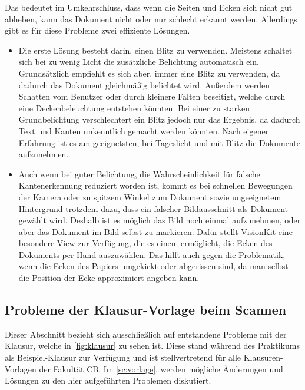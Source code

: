 \documentclass[notables, nomenclature, oneside, 150]{HSMW-Thesis}
\begin{document}
			Das bedeutet im Umkehrschluss, dass wenn die Seiten und Ecken sich nicht gut abheben, kann das Dokument nicht oder nur schlecht erkannt werden. Allerdings gibt es für diese Probleme zwei effiziente Lösungen. 
			\begin{itemize}
				\item Die erste Lösung besteht darin, einen Blitz zu verwenden. Meistens schaltet sich bei zu wenig Licht die zusätzliche Belichtung automatisch ein. Grundsätzlich empfiehlt es sich aber, immer eine Blitz zu verwenden, da dadurch das Dokument gleichmäßig belichtet wird. Außerdem werden Schatten vom Benutzer oder durch kleinere Falten beseitigt, welche durch eine Deckenbeleuchtung entstehen könnten. Bei einer zu starken Grundbelichtung verschlechtert ein Blitz jedoch nur das Ergebnis, da dadurch Text und Kanten unkenntlich gemacht werden könnten. Nach eigener Erfahrung ist es am geeignetsten, bei Tageslicht und mit Blitz die Dokumente aufzunehmen. 
				\item Auch wenn bei guter Belichtung, die Wahrscheinlichkeit für falsche Kantenerkennung reduziert worden ist, kommt es bei schnellen Bewegungen der Kamera oder zu spitzem Winkel zum Dokument sowie ungeeignetem Hintergrund trotzdem dazu, dass ein falscher Bildausschnitt als Dokument gewählt wird. Deshalb ist es möglich das Bild noch einmal aufzunehmen, oder aber das Dokument im Bild selbst zu markieren. Dafür stellt VisionKit eine besondere View zur Verfügung, die es einem ermöglicht, die Ecken des Dokuments per Hand auszuwählen. Das hilft auch gegen die Problematik, wenn die Ecken des Papiers umgekickt oder abgerissen sind, da man selbst die Position der Ecke approximiert angeben kann. 
			\end{itemize}
		
		\subsection{Probleme der Klausur-Vorlage beim Scannen}\label{ssc:problemevorlage}
			Dieser Abschnitt bezieht sich ausschließlich auf entstandene Probleme mit der Klausur, welche in \autoref{fig:klausur} zu sehen ist. Diese stand während des Praktikums als Beispiel-Klausur zur Verfügung und ist stellvertretend für alle Klausuren-Vorlagen der Fakultät CB. Im \autoref{sc:vorlage}, werden mögliche Änderungen und Lösungen zu den hier aufgeführten Problemen diskutiert.
		
\end{document}
